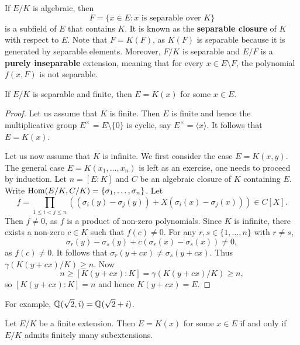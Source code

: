 \chapter{}

\label{separable}
If $E/K$ is algebraic, then 
\[
    F=\{x\in E:x\text{ is separable over }K\}
\]
is a subfield of $E$ that contains $K$. It is known as 
the \textbf{separable closure} of $K$ with respect to $E$. 
Note that $F=K(F)$, as
$K(F)$ is separable because it is generated by separable elements. Moreover, 
$F/K$ is separable and 
$E/F$ is a \textbf{purely inseparable} extension, meaning that
for every $x\in E\setminus F$, the polynomial $f(x,F)$ is not separable. 

\begin{proposition}
\label{pro:monogenic}
    If $E/K$ is separable and finite, then $E=K(x)$ for some $x\in E$. 
\end{proposition}

\begin{proof}
    Let us assume that $K$ is finite. Then $E$ is finite and hence 
    the multiplicative group $E^{\times}=E\setminus\{0\}$ 
    is cyclic, say $E^{\times}=\langle x\rangle$. It follows
    that $E=K(x)$. 
    
    Let us now assume that $K$ is infinite. We first consider the case 
    $E=K(x,y)$. The general case $E=K(x_1,\dots,x_n)$ is left as an exercise, one needs to proceed by induction. 
    Let $n=[E:K]$ and 
    $C$ be an algebraic closure of $K$ containing $E$. 
    Write $\operatorname{Hom}(E/K,C/K)=\{\sigma_1,\dots,\sigma_n\}$. Let 
    \[
    f=\prod_{1\leq i<j\leq n}\left((\sigma_i(y)-\sigma_j(y))
    +X(\sigma_i(x)-\sigma_j(x))\right)\in C[X].
    \]
    Then $f\ne 0$, as $f$ is a product of non-zero polynomials. Since $K$ is infinite, 
    there exists a non-zero 
    $c\in K$ such that $f(c)\ne 0$. For any $r,s\in\{1,\dots,n\}$ with 
    $r\ne s$,
    \[
        \sigma_r(y)-\sigma_s(y)+c(\sigma_r(x)-\sigma_s(x))\ne 0,
    \]
    as $f(c)\ne0$. It follows that $\sigma_r(y+cx)\ne\sigma_s(y+cx)$. Thus $\gamma(K(y+cx)/K)\geq n$. 
    Now 
    \[
    n\geq [K(y+cx):K]=\gamma(K(y+cx)/K)\geq n,
    \]
    so $[K(y+cx):K]=n$ and
    hence $K(y+cx)=E$. 
\end{proof}

For example, $\mathbb{Q}(\sqrt{2},i)=\mathbb{Q}(\sqrt{2}+i)$. 

\begin{proposition}
    Let $E/K$ be a finite extension. Then $E=K(x)$ for some $x\in E$ 
    if and only if $E/K$ admits finitely many subextensions. 
\end{proposition}

